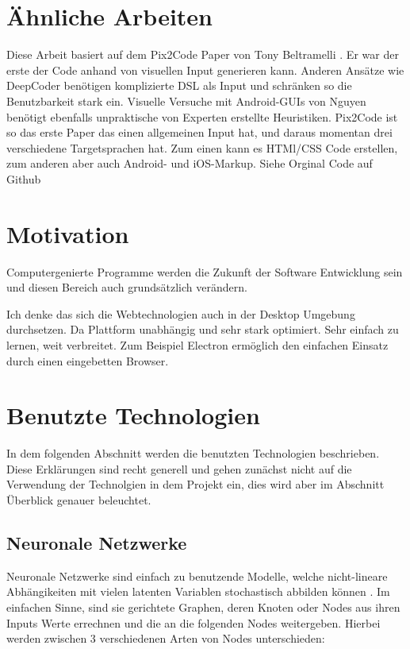 \documentclass[pdftex,a4paper,halfparskip]{scrartcl}
\begin{document}
\section{Ähnliche Arbeiten}

Diese Arbeit basiert auf dem Pix2Code Paper von Tony Beltramelli \cite{Beltramelli17} . Er war der erste der Code anhand von visuellen Input generieren kann. 
Anderen Ansätze wie DeepCoder \cite{DeepCoder16} benötigen komplizierte DSL als Input und schränken so die Benutzbarkeit stark ein. Visuelle Versuche mit Android-GUIs von Nguyen \cite{Nguyen15} benötigt ebenfalls unpraktische von Experten erstellte Heuristiken. Pix2Code ist so das erste Paper das einen allgemeinen Input hat, und daraus momentan drei verschiedene Targetsprachen hat. Zum einen kann es HTMl/CSS Code erstellen, zum anderen aber auch Android- und iOS-Markup. Siehe Orginal Code auf Github \cite{Beltramelli17Github}


\section{Motivation}
Computergenierte Programme werden die Zukunft der Software Entwicklung sein und diesen Bereich auch grundsätzlich verändern. 

Ich denke das sich die Webtechnologien auch in der Desktop Umgebung durchsetzen.  Da Plattform unabhängig und sehr stark optimiert. Sehr einfach zu lernen, weit verbreitet. Zum Beispiel Electron \cite{electron} ermöglich den einfachen Einsatz durch einen eingebetten Browser.



\section{Benutzte Technologien}

In dem folgenden Abschnitt werden die benutzten Technologien beschrieben. Diese Erklärungen sind recht generell und gehen zunächst nicht auf die Verwendung der Technolgien in dem Projekt ein, dies wird aber im Abschnitt Überblick genauer beleuchtet.

\subsection{Neuronale Netzwerke}
Neuronale Netzwerke sind einfach zu benutzende Modelle, welche nicht-lineare Abhängikeiten mit vielen latenten Variablen stochastisch abbilden können \cite{nnWebsite}. Im einfachen Sinne, sind sie gerichtete Graphen, deren Knoten oder Nodes aus ihren Inputs Werte errechnen und die an die folgenden Nodes weitergeben. Hierbei werden zwischen 3 verschiedenen Arten von Nodes unterschieden:
\end{document}
